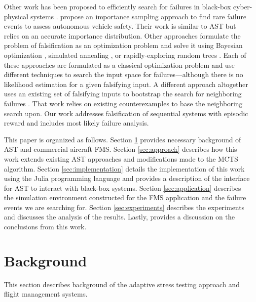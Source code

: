 Other work has been proposed to efficiently search for failures in black-box cyber-physical systems \cite{corso2020survey}. \citeauthor*{trustworthy_ai} propose an importance sampling approach to find rare failure events to assess autonomous vehicle safety.
Their work is similar to AST but relies on an accurate importance distribution.
Other approaches formulate the problem of falsification as an optimization problem and solve it using Bayesian optimization \cite{bayes_opt}, simulated annealing \cite{abbas2013probabilistic,aerts2018temporal}, or rapidly-exploring random trees  \cite{rrts}.
Each of these approaches are formulated as a classical optimization problem and use different techniques to search the input space for failures---although there is no likelihood estimation for a given falsifying input.
A different approach altogether uses an existing set of falsifying inputs to bootstrap the search for neighboring failures \cite{bootstrap}.
That work relies on existing counterexamples to base the neighboring search upon.
Our work addresses falsification of sequential systems with episodic reward and includes most likely failure analysis.




This paper is organized as follows. 
Section \ref{sec:background} provides necessary background of AST and commercial aircraft FMS. Section \ref{sec:approach} describes how this work extends existing AST approaches and modifications made to the MCTS algorithm. Section \ref{sec:implementation} details the implementation of this work using the Julia programming language and provides a description of the interface for AST to interact with black-box systems. Section \ref{sec:application} describes the simulation environment constructed for the FMS application and the failure events we are searching for. Section \ref{sec:experiments} describes the experiments and discusses the analysis of the results. Lastly,  provides a discussion on the conclusions from this work.




\section{Background} \label{sec:background}
This section describes background of the adaptive stress testing approach and flight management systems.

